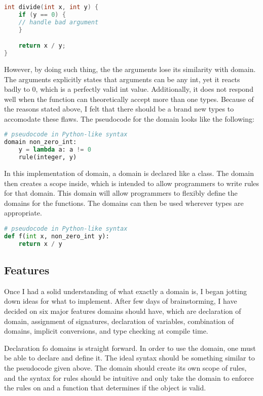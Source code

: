 \begin{lstlisting}[language=C++, caption={Domain example}]
int divide(int x, int y) {
    if (y == 0) {
	// handle bad argument
    }

    return x / y;
}
\end{lstlisting}

However, by doing such thing, the the arguments lose its similarity with domain.  The arguments explicitly states that arguments can be any int, yet it reacts badly to 0, which is a perfectly valid int value.  Additionally, it does not respond well when the function can theoretically accept more than one types.  Because of the reasons stated above, I felt that there should be a brand new types to accomodate these flaws.  The pseudocode for the domain looks like the following:

\begin{lstlisting}[language=Python, caption={Domain pseudocode}]
# pseudocode in Python-like syntax
domain non_zero_int: 
    y = lambda a: a != 0
    rule(integer, y)
\end{lstlisting}

In this implementation of domain, a domain is declared like a class.  The domain then creates a scope inside, which is intended to allow programmers to write rules for that domain.  This domain will allow programmers to flexibly define the domains for the functions.  The domains can then be used wherever types are appropriate.

\begin{lstlisting}[language=Python, caption={Domain pseudocode}]
# pseudocode in Python-like syntax
def f(int x, non_zero_int y):
    return x / y
\end{lstlisting}

\subsection{Features}

Once I had a solid understanding of what exactly a domain is, I began jotting down ideas for what to implement.  After few days of brainstorming, I have decided on six major features domains should have, which are declaration of domain, assignment of signatures, declaration of variables, combination of domains, implicit conversions, and type checking at compile time.

Declaration fo domains is straight forward.  In order to use the domain, one must be able to declare and define it.  The ideal syntax should be something similar to the pseudocode given above.  The domain should create its own scope of rules, and the syntax for rules should be intuitive and only take the domain to enforce the rules on and a function that determines if the object is valid.


